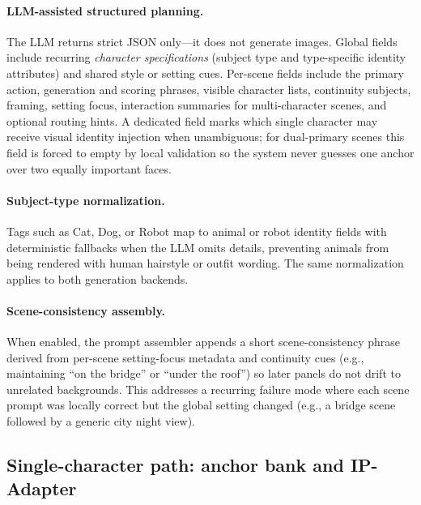 \paragraph{LLM-assisted structured planning.}
The LLM returns strict JSON only---it does not generate images.
Global fields include recurring \emph{character specifications} (subject type and type-specific identity attributes) and shared style or setting cues.
Per-scene fields include the primary action, generation and scoring phrases, visible character lists, continuity subjects, framing, setting focus, interaction summaries for multi-character scenes, and optional routing hints.
A dedicated field marks which single character may receive visual identity injection when unambiguous; for dual-primary scenes this field is forced to empty by local validation so the system never guesses one anchor over two equally important faces.

\paragraph{Subject-type normalization.}
Tags such as Cat, Dog, or Robot map to animal or robot identity fields with deterministic fallbacks when the LLM omits details, preventing animals from being rendered with human hairstyle or outfit wording.
The same normalization applies to both generation backends.

\paragraph{Scene-consistency assembly.}
When enabled, the prompt assembler appends a short scene-consistency phrase derived from per-scene setting-focus metadata and continuity cues (e.g., maintaining ``on the bridge'' or ``under the roof'') so later panels do not drift to unrelated backgrounds.
This addresses a recurring failure mode where each scene prompt was locally correct but the global setting changed (e.g., a bridge scene followed by a generic city night view).

\subsection{Single-character path: anchor bank and IP-Adapter}
\label{sec:single}

